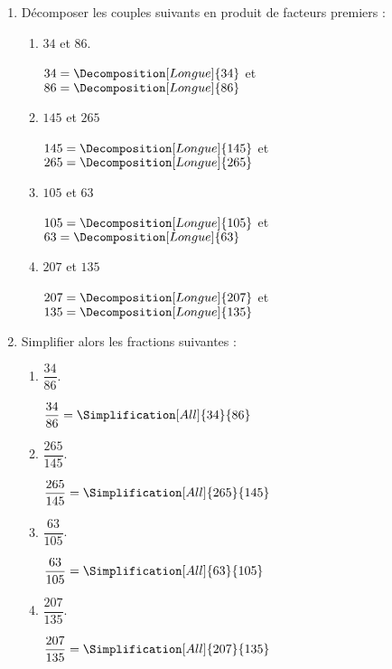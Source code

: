 \begin{corrige}
    \begin{spacing}{1.5}
        \begin{enumerate}
            \item Décomposer les couples suivants en produit de facteurs premiers :
            \begin{enumerate}
                \item $34$ et $86$.
                
                {\red $34 = \Decomposition[Longue]{34}$ et $86 = \Decomposition[Longue]{86}$}
                \item $145$ et $265$
                
                {\red $145 = \Decomposition[Longue]{145}$ et $265 = \Decomposition[Longue]{265}$}
                \item $105$ et $63$
                
                {\red $105 = \Decomposition[Longue]{105}$ et $63 = \Decomposition[Longue]{63}$}
                \item $207$ et $135$
                
                {\red $207 = \Decomposition[Longue]{207}$ et $135 = \Decomposition[Longue]{135}$}
            \end{enumerate}
            \item Simplifier alors les fractions suivantes :
            \begin{enumerate}
                \item $\dfrac{34}{86}$.
                
                {\red $\dfrac{34}{86} = \displaystyle\Simplification[All]{34}{86}$}
                \item $\dfrac{265}{145}$.
                
                {\red $\dfrac{265}{145} = \displaystyle\Simplification[All]{265}{145}$}
                \item $\dfrac{63}{105}$.
                
                {\red $\dfrac{63}{105} = \displaystyle\Simplification[All]{63}{105}$}
                \item $\dfrac{207}{135}$.
                
                {\red $\dfrac{207}{135} = \displaystyle\Simplification[All]{207}{135}$}
            \end{enumerate}
        \end{enumerate}                   
    \end{spacing}
\end{corrige}

